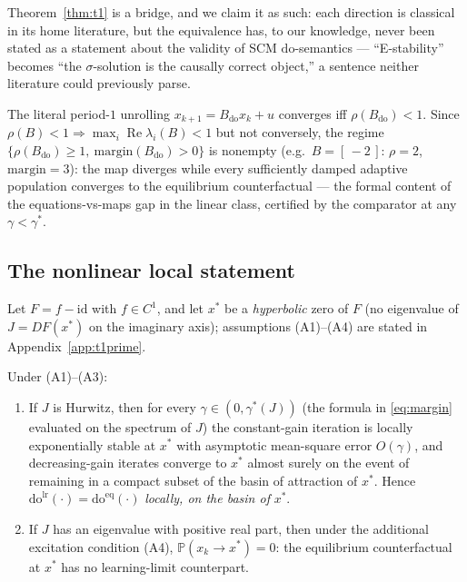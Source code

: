 \documentclass[pmlr]{jmlr}
\newcommand{\Prob}{\mathbb{P}}
\newcommand{\doop}{\mathrm{do}}
\newcommand{\doeq}[1]{\doop^{\mathrm{eq}}(#1)}
\newcommand{\dolr}[1]{\doop^{\mathrm{lr}}(#1)}
\newcommand{\margin}{\mathrm{margin}}
\newcommand{\gstar}{\gamma^{*}}
\begin{document}
Theorem~\ref{thm:t1} is a bridge, and we claim it as such: each direction is classical in its
home literature, but the equivalence has, to our knowledge, never been stated as a statement
about the validity of SCM $\doop$-semantics --- ``E-stability'' becomes ``the $\sigma$-solution
is the causally correct object,'' a sentence neither literature could previously parse.

\begin{corollary}\label{cor:maps}
The literal period-$1$ unrolling $x_{k+1} = B_{\doop} x_k + u$ converges iff
$\rho(B_{\doop}) < 1$. Since $\rho(B) < 1 \Rightarrow \max_i \operatorname{Re}\lambda_i(B) < 1$
but not conversely, the regime $\{\rho(B_{\doop}) \geq 1,\ \margin(B_{\doop}) > 0\}$ is nonempty
(e.g.\ $B = [\,-2\,]$: $\rho = 2$, $\margin = 3$): the map diverges while every sufficiently
damped adaptive population converges to the equilibrium counterfactual --- the formal content of
the equations-vs-maps gap in the linear class, certified by the comparator at any
$\gamma < \gstar$.
\end{corollary}

\subsection{The nonlinear local statement}\label{sec:t1prime}

Let $F = f - \mathrm{id}$ with $f \in C^1$, and let $x^*$ be a \emph{hyperbolic} zero of $F$ (no
eigenvalue of $J = DF(x^*)$ on the imaginary axis); assumptions (A1)--(A4) are stated in
Appendix~\ref{app:t1prime}.

\begin{theorem}\label{thm:t1prime}
Under (A1)--(A3):
\begin{enumerate}
\item[(i)] If $J$ is Hurwitz, then for every $\gamma \in (0, \gstar(J))$ (the formula in
\eqref{eq:margin} evaluated on the spectrum of $J$) the constant-gain iteration is locally
exponentially stable at $x^*$ with asymptotic mean-square error $O(\gamma)$, and decreasing-gain
iterates converge to $x^*$ almost surely on the event of remaining in a compact subset of the
basin of attraction of $x^*$. Hence $\dolr{\cdot} = \doeq{\cdot}$ \emph{locally, on the basin of}
$x^*$.
\item[(ii)] If $J$ has an eigenvalue with positive real part, then under the additional
excitation condition (A4), $\Prob(x_k \to x^*) = 0$: the equilibrium counterfactual at $x^*$ has
no learning-limit counterpart.
\end{enumerate}
\end{theorem}
\end{document}
